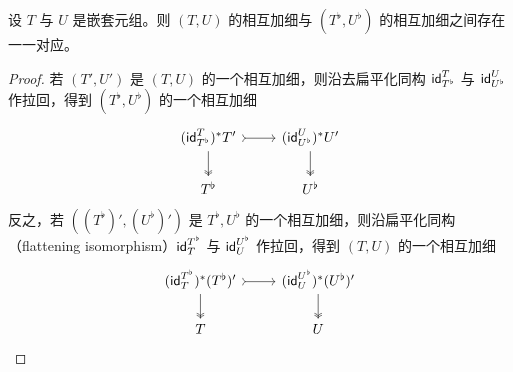 \begin{lemma}\label{mutualrefinementsofflattenings}
    设 $T$ 与 $U$ 是嵌套元组。则 $(T,U)$ 的相互加细与 $(T^\flat,U^\flat)$ 的相互加细之间存在一一对应。
\end{lemma}
\begin{proof}
    若 $(T',U')$ 是 $(T,U)$ 的一个相互加细，则沿去扁平化同构 $\mathsf{id}_{T^\flat}^T$ 与 $\mathsf{id}_{U^\flat}^U$ 作拉回，得到 $(T^\flat, U^\flat)$ 的一个相互加细
    \[ \begin{tikzcd}
 (\id_{T^\flat}^T)^*T' \ar[r,rightarrowtail] \ar[d, two heads] & (\id_{U^\flat}^U)^*U' \ar[d,two heads] \\
T^\flat & U^\flat
\end{tikzcd} \]
    反之，若 $((T^\flat)',(U^\flat)')$ 是 $T^\flat,U^\flat$ 的一个相互加细，则沿扁平化同构（flattening isomorphism）$\mathsf{id}^{T^\flat}_T$ 与 $\mathsf{id}^{U^\flat}_U$ 作拉回，得到 $(T, U)$ 的一个相互加细
    \[ \begin{tikzcd}
 (\id^{T^\flat}_T)^*(T^\flat)' \ar[r,rightarrowtail] \ar[d, two heads] & (\id^{U^\flat}_U)^*(U^\flat)' \ar[d,two heads] \\
T & U
\end{tikzcd} \]
\end{proof}






\newpage
